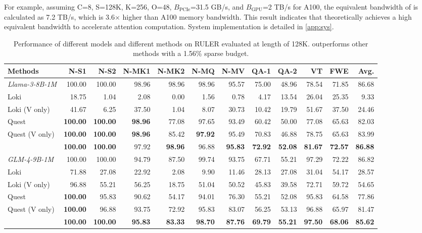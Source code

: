 For example, assuming C=8, S=128K, K=256, O=48, $B_\text{PCIe}$=31.5 GB/s, and $B_\text{GPU}$=2 TB/s for A100, the equivalent bandwidth of \Sys is calculated as 7.2 TB/s, which is 3.6$\times$ higher than A100 memory bandwidth. This result indicates that \Sys theoretically achieves a high equivalent bandwidth to accelerate attention computation. System implementation is detailed in \cref{app:sys}.
\begin{table}[h]
\centering
\caption{Performance of different models and different methods on RULER \citep{hsieh2024ruler} evaluated at length of 128K. \Sys outperforms other methods with a 1.56\% sparse budget. }
\setlength{\tabcolsep}{3.5pt} %
\small
\begin{tabular}{l|rrrrrrrrrr|r}
\toprule
Methods &  N-S1 & N-S2 & N-MK1&N-MK2&N-MQ&N-MV&QA-1&QA-2&VT&FWE &Avg.\\ \midrule
	\textit{Llama-3-8B-1M} & 100.00&100.00&98.96&98.96&98.96&95.57&75.00&48.96&78.54&71.85 & 86.68\\
         Loki & 18.75 & 1.04 & 2.08 & 0.00 & 1.56 & 0.78 & 4.17 & 13.54 & 26.04 & 25.35 & 9.33\\
         Loki (V only) & 41.67 & 6.25 & 37.50 & 1.04 & 8.07 & 30.73 & 10.42 & 19.79 & 51.67 & 37.50& 24.46 \\
	Quest & \textbf{100.00} & \textbf{100.00}& \textbf{98.96} & 77.08 & 97.65 & 93.49 & 60.42 & 50.00 & 77.08 & 65.63 & 82.03  \\
    Quest (V only) & \textbf{100.00} & \textbf{100.00} &\textbf{98.96} & 85.42 & \textbf{97.92} & 95.49 & 70.83 & 46.88 & 78.75 & 65.63&83.99\\
	\rowcolor{cyan!10}
	\Sys  & \textbf{100.00} & \textbf{100.00} & 97.92&\textbf{98.96}&96.88&\textbf{95.83}&\textbf{72.92}&\textbf{52.08}&\textbf{81.67}&\textbf{72.57}&\textbf{86.88}\\
	\midrule
        \textit{GLM-4-9B-1M}&100.00 & 100.00 & 94.79&87.50&99.74&93.75&67.71&55.21&97.29&72.22&86.82 \\
         Loki & 71.88 & 27.08 & 22.92 & 2.08 & 9.90 & 11.46 & 28.13 & 27.08 & 31.04 & 54.17& 28.57\\
         Loki (V only) & 96.88 & 55.21 & 56.25 & 18.75 & 51.04 & 50.52 & 45.83 & 39.58 & 72.71 & 59.72 & 54.65\\
	Quest &  \textbf{100.00} & 95.83 & 90.62 & 54.17 & 94.01 & 76.30 & 55.21 & 52.08 & 95.83 & 64.58 & 77.86 \\
        Quest (V only) &  \textbf{100.00} & 96.88 & 93.75 & 72.92 & 95.83 & 83.07 & 56.25 & 53.13 & 96.88 & 65.97 & 81.47\\
	\rowcolor{cyan!10}
	\Sys  & \textbf{100.00}&\textbf{100.00}&\textbf{95.83}&\textbf{83.33}&\textbf{98.70}&\textbf{87.76}&\textbf{69.79}&\textbf{55.21}&\textbf{97.50}&\textbf{68.06}&\textbf{85.62}\\


\end{tabular}
\end{table}

